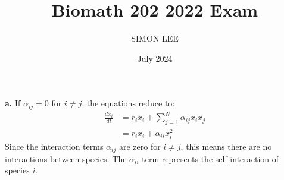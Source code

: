 \documentclass{article}
\title{Biomath 202 2022 Exam}
\author{SIMON LEE}
\date{July 2024}
\begin{document}
\maketitle

\section{}

\textbf{a.} If $\alpha_{ij} = 0$ for $i \neq j$, the equations reduce to:
\begin{align*}
\frac{dx_i}{dt} &= r_i x_i + \sum_{j=1}^N \alpha_{ij} x_i x_j \\
&= r_i x_i + \alpha_{ii} x_i^2
\end{align*}
Since the interaction terms $\alpha_{ij}$ are zero for $i \neq j$, this means there are no interactions between species. The $\alpha_{ii}$ term represents the self-interaction of species $i$.\\
\end{document}
